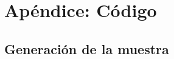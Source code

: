 \documentclass[12pt,a4paper,]{book}
\title{}
\author{Nombre Completo Autor}
\date{18/11/2021}
\def\ifdoblecara{} %
\def\ifprincipal{} %
\let\ifprincipal\undefined %
\numberwithin{dummy}{section}
\theoremstyle{ocrenumbox}
\theoremstyle{blacknumex}
\theoremstyle{blacknumbox}
\theoremstyle{ocrenum}
\theoremstyle{ocrenum}
\begin{document}




\raggedbottom

\ifdefined\ifprincipal
\else
\setlength{\parindent}{1em}
\pagestyle{fancy}
\setcounter{tocdepth}{4}
\tableofcontents

\fi

\ifdefined\ifdoblecara
\fancyhead{}{}
\fancyhead[LE,RO]{\scriptsize\rightmark}
\fancyfoot[LO,RE]{\scriptsize\slshape \leftmark}
\fancyfoot[C]{}
\fancyfoot[LE,RO]{\footnotesize\thepage}
\else
\fancyhead{}{}
\fancyhead[RO]{\scriptsize\rightmark}
\fancyfoot[LO]{\scriptsize\slshape \leftmark}
\fancyfoot[C]{}
\fancyfoot[RO]{\footnotesize\thepage}
\fi

\renewcommand{\headrulewidth}{0.4pt}
\renewcommand{\footrulewidth}{0.4pt}

\hypertarget{apuxe9ndice-cuxf3digo}{%
\chapter{Apéndice: Código}\label{apuxe9ndice-cuxf3digo}}

\hypertarget{generaciuxf3n-de-la-muestra}{%
\section{Generación de la muestra}\label{generaciuxf3n-de-la-muestra}}
\end{document}
